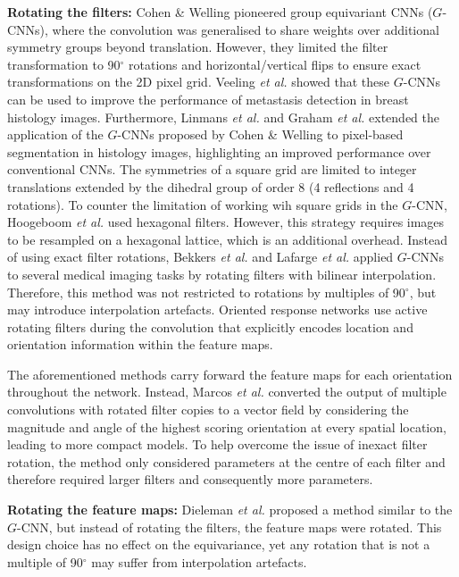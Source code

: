 \documentclass[journal]{IEEEtran}
\begin{document}
\textbf{Rotating the filters: }Cohen \& Welling \cite{cohen2016group} pioneered group equivariant CNNs ($G$-CNNs), where the convolution was generalised to share weights over additional symmetry groups beyond translation. However, they limited the filter transformation to 90$^{\circ}$ rotations and horizontal/vertical flips to ensure exact transformations on the 2D pixel grid. Veeling \textit{et al.} \cite{veeling2018rotation} showed that these $G$-CNNs can be used to improve the performance of metastasis detection in breast histology images. Furthermore, Linmans \textit{et al.} \cite{linmans2018sample} and Graham \textit{et al.} \cite{graham2019rota} extended the application of the $G$-CNNs proposed by Cohen \& Welling to pixel-based segmentation in histology images, highlighting an improved performance over conventional CNNs. The symmetries of a square grid are limited to integer translations extended by the dihedral group of order 8 (4 reflections and 4 rotations). To counter the limitation of working wih square grids in the $G$-CNN, Hoogeboom \textit{et al.} \cite{hoogeboom2018hexaconv} used hexagonal filters. However, this strategy requires images to be resampled on a hexagonal lattice, which is an additional overhead.
Instead of using exact filter rotations, Bekkers \textit{et al.} \cite{bekkers2018roto} and Lafarge \textit{et al.} \cite{lafarge2020roto} applied $G$-CNNs to several medical imaging tasks by rotating filters with bilinear interpolation. Therefore, this method was not restricted to rotations by multiples of 90$^{\circ}$, but may introduce interpolation artefacts. Oriented response networks \cite{zhou2017oriented} use active rotating filters during the convolution that explicitly encodes location and orientation information within the feature maps. 

The aforementioned methods carry forward the feature maps for each orientation throughout the network. Instead, Marcos \textit{et al.} \cite{marcos2017rotation} converted the output of multiple convolutions with rotated filter copies to a vector field by considering the magnitude and angle of the highest scoring orientation at every spatial location, leading to more compact models. To help overcome the issue of inexact filter rotation, the method only considered parameters at the centre of each filter and therefore required larger filters and consequently more parameters.

\textbf{Rotating the feature maps: }Dieleman \textit{et al.} proposed a method similar to the $G$-CNN, but instead of rotating the filters, the feature maps were rotated. This design choice has no effect on the equivariance, yet any rotation that is not a multiple of 90$^{\circ}$ may suffer from interpolation artefacts. 
\end{document}
